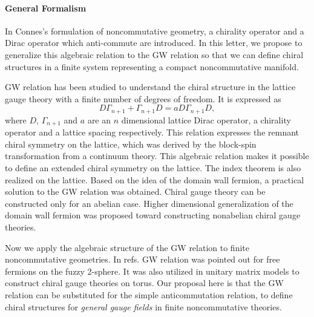 \documentclass[a4paper,prl,showpacs,twocolumn]{revtex4}
\begin{document}
\paragraph{{\bf General Formalism}} 
In Connes's formulation of noncommutative geometry, 
a chirality operator and a Dirac operator which anti-commute 
are introduced.
In this letter, we propose to generalize 
this algebraic relation to the GW relation so that we can 
define chiral structures 
in a finite system representing a compact noncommutative manifold.
\par
GW relation has been studied to understand the chiral structure
in the lattice gauge theory with  a finite number of degrees of freedom.
It is expressed as 
\begin{equation}
D\Gamma_{n+1} + \Gamma_{n+1} D =a  D \Gamma_{n+1} D,
\label{GWintro}
\end{equation}
where $D$, $\Gamma_{n+1}$ and $a$ are  an $n$ dimensional 
lattice Dirac operator, a chirality operator and a lattice spacing
respectively.
This relation expresses the remnant chiral symmetry 
on the lattice, which was derived by  
the block-spin transformation
from a continuum theory\cite{GinspargWilson}. 
This algebraic relation makes it possible to define an extended chiral 
symmetry on the lattice\cite{Luscher,Nieder}. 
The index theorem  is also realized on the
lattice\cite{Hasenfratzindex,Luscher}.
Based on the idea of the domain wall fermion, a practical 
solution to the GW relation was obtained\cite{Neuberger}. 
Chiral gauge theory can be  
constructed only for an abelian case\cite{abeliangauge}. 
Higher dimensional generalization of the domain wall 
fermion was proposed toward constructing nonabelian 
chiral gauge theories\cite{KN}.
\par
Now we apply the algebraic structure of the GW relation to
finite noncommutative geometries.
In refs.\cite{balaGW} GW relation was pointed out 
for free fermions on the fuzzy 2-sphere.
It was also utilized in unitary matrix models to construct 
chiral gauge theories on torus\cite{Nishi}. 
Our proposal here is that the GW relation can be 
substituted for the simple anticommutation relation, 
to define chiral structures for {\it general gauge fields} 
in finite noncommutative theories.
\end{document}
